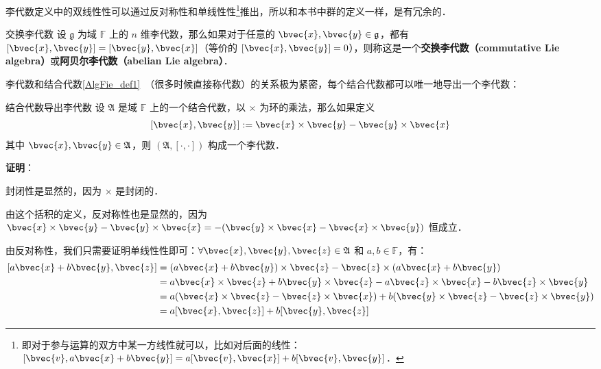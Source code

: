 
李代数定义中的双线性性可以通过反对称性和单线性性\footnote{即对于参与运算的双方中某一方线性就可以，比如对后面的线性：$[\bvec{v},a\bvec{x}+b\bvec{y}]=a[\bvec{v}, \bvec{x}]+b[\bvec{v}, \bvec{y}]$．}推出，所以和本书中群的定义一样，是有冗余的．

\begin{definition}{交换李代数}
设 $\mathfrak{g}$ 为域 $\mathbb{F}$ 上的 $n$ 维李代数，那么如果对于任意的 $\bvec{x},\bvec{y}\in\mathfrak{g}$，都有 $[\bvec{x}, \bvec{y}] = [\bvec{y}, \bvec{x}]$（等价的 $[\bvec{x}, \bvec{y}] = 0$），则称这是一个\textbf{交换李代数（commutative Lie algebra）}或\textbf{阿贝尔李代数（abelian Lie algebra）}．
\end{definition}

李代数和结合代数\autoref{AlgFie_def1}~（很多时候直接称代数）的关系极为紧密，每个结合代数都可以唯一地导出一个李代数：

\begin{theorem}{结合代数导出李代数}
设 $\mathfrak{A}$ 是域 $\mathbb{F}$ 上的一个结合代数，以 $\times$ 为环的乘法，那么如果定义
$$
[\bvec{x}, \bvec{y}] := \bvec{x}\times \bvec{y}-\bvec{y}\times \bvec{x}
$$
其中 $\bvec{x}, \bvec{y}\in\mathfrak{A}$，则 $(\mathfrak{A}, [\cdot, \cdot])$ 构成一个李代数．
\end{theorem}

\textbf{证明}：

封闭性是显然的，因为 $\times$ 是封闭的．

由这个括积的定义，反对称性也是显然的，因为 $\bvec{x}\times \bvec{y}-\bvec{y}\times \bvec{x}=-(\bvec{y}\times \bvec{x}-\bvec{x}\times \bvec{y})$ 恒成立．

由反对称性，我们只需要证明单线性性即可：$\forall \bvec{x}, \bvec{y}, \bvec{z}\in\frak{A}$ 和 $a, b\in\mathbb{F}$，有：
\begin{equation}
\begin{aligned}
{[a\bvec{x}+b\bvec{y}, \bvec{z}]}&=(a\bvec{x}+b\bvec{y})\times\bvec{z}-\bvec{z}\times(a\bvec{x}+b\bvec{y})\\
&=a\bvec{x}\times\bvec{z}+b\bvec{y}\times\bvec{z}-a\bvec{z}\times\bvec{x}-b\bvec{z}\times\bvec{y}\\
&=a(\bvec{x}\times\bvec{z}-\bvec{z}\times\bvec{x})+b(\bvec{y}\times\bvec{z}-\bvec{z}\times\bvec{y})\\
&=a[\bvec{x}, \bvec{z}]+b[\bvec{y}, \bvec{z}]
\end{aligned}
\end{equation}


